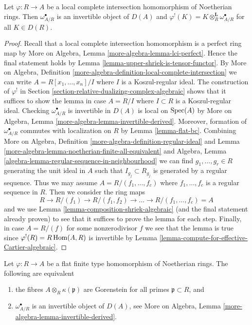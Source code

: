 \begin{lemma}
\label{lemma-lci-shriek}
Let $\varphi : R \to A$ be a local complete intersection homomorphism of
Noetherian rings. Then $\omega_{A/R}^\bullet$ is an invertible object of
$D(A)$ and $\varphi^!(K) = K \otimes_R^\mathbf{L} \omega_{A/R}^\bullet$
for all $K \in D(R)$.
\end{lemma}

\begin{proof}
Recall that a local complete intersection homomorphism is a perfect
ring map by More on Algebra, Lemma \ref{more-algebra-lemma-lci-perfect}.
Hence the final statement holds by
Lemma \ref{lemma-upper-shriek-is-tensor-functor}.
By More on Algebra, Definition
\ref{more-algebra-definition-local-complete-intersection}
we can write $A = R[x_1, \ldots, x_n]/I$ where $I$ is a
Koszul-regular ideal.
The construction of $\varphi^!$ in
Section \ref{section-relative-dualizing-complex-algebraic}
shows that it suffices to show the lemma in case
$A = R/I$ where $I \subset R$ is a Koszul-regular ideal.
Checking $\omega_{A/R}^\bullet$ is invertible in $D(A)$
is local on $\mathop{\mathrm{Spec}}(A)$ by More on Algebra, Lemma
\ref{more-algebra-lemma-invertible-derived}.
Moreover, formation of $\omega_{A/R}^\bullet$ commutes with
localization on $R$ by Lemma \ref{lemma-flat-bc}.
Combining
More on Algebra, Definition \ref{more-algebra-definition-regular-ideal} and
Lemma \ref{more-algebra-lemma-noetherian-finite-all-equivalent} and
Algebra, Lemma \ref{algebra-lemma-regular-sequence-in-neighbourhood}
we can find $g_1, \ldots, g_r \in R$ generating the unit ideal in $A$
such that $I_{g_j} \subset R_{g_j}$ is generated by a regular sequence.
Thus we may assume $A = R/(f_1, \ldots, f_c)$ where $f_1, \ldots, f_c$
is a regular sequence in $R$. Then we consider the ring maps
$$
R \to R/(f_1) \to R/(f_1, f_2) \to \ldots \to R/(f_1, \ldots, f_c) = A
$$
and we use Lemma \ref{lemma-composition-shriek-algebraic}
(and the final statement already proven)
to see that it suffices to prove the lemma for each step.
Finally, in case $A = R/(f)$ for some nonzerodivisor $f$
we see that the lemma is true since $\varphi^!(R) = R\mathop{\mathrm{Hom}}\nolimits(A, R)$
is invertible by Lemma \ref{lemma-compute-for-effective-Cartier-algebraic}.
\end{proof}

\begin{lemma}
\label{lemma-gorenstein-shriek}
Let $\varphi : R \to A$ be a flat finite type homomorphism of Noetherian rings.
The following are equivalent
\begin{enumerate}
\item the fibres $A \otimes_R \kappa(\mathfrak p)$ are Gorenstein
for all primes $\mathfrak p \subset R$, and
\item $\omega_{A/R}^\bullet$ is an invertible object of $D(A)$, see
More on Algebra, Lemma \ref{more-algebra-lemma-invertible-derived}.
\end{enumerate}
\end{lemma}


